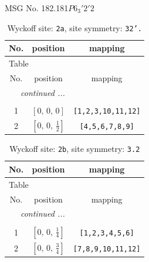 \documentclass[fleqn,8pt]{jsarticle}
\begin{document}
\setcounter{MaxMatrixCols}{32}

\renewcommand{\tablename}{Table~}
\renewcommand{\figurename}{Figure~}
\begin{center}
\LARGE
MSG No. 182.181\quad$P6_{3}'2'2$
\end{center}
\renewcommand{\arraystretch}{1.2}
\begin{longtable}{ccc}
\caption{Wyckoff site: {\tt 2a}, site symmetry: {\tt 32'.}}
 \\
 \hline \hline
No. & position & mapping \\ \hline \endfirsthead

\multicolumn{2}{l}{\tablename\ \thetable{}} \\
 \hline \hline
No. & position & mapping \\ \hline \endhead

 \hline \hline
\multicolumn{2}{r}{\footnotesize\it continued ...} \\ \endfoot

 \hline \hline
\multicolumn{2}{r}{} \\ \endlastfoot

1 & $\left[ 0,\, 0,\, 0 \right]$ & {\tt [1,2,3,10,11,12]} \\ \hline
2 & $\left[ 0,\, 0,\, \frac{1}{2} \right]$ & {\tt [4,5,6,7,8,9]} \\
\end{longtable}
\renewcommand{\arraystretch}{1.2}
\begin{longtable}{ccc}
\caption{Wyckoff site: {\tt 2b}, site symmetry: {\tt 3.2}}
 \\
 \hline \hline
No. & position & mapping \\ \hline \endfirsthead

\multicolumn{2}{l}{\tablename\ \thetable{}} \\
 \hline \hline
No. & position & mapping \\ \hline \endhead

 \hline \hline
\multicolumn{2}{r}{\footnotesize\it continued ...} \\ \endfoot

 \hline \hline
\multicolumn{2}{r}{} \\ \endlastfoot

1 & $\left[ 0,\, 0,\, \frac{1}{4} \right]$ & {\tt [1,2,3,4,5,6]} \\ \hline
2 & $\left[ 0,\, 0,\, \frac{3}{4} \right]$ & {\tt [7,8,9,10,11,12]} \\
\end{longtable}
\end{document}
